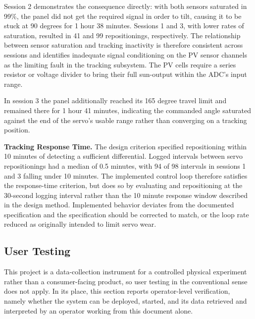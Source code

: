 \documentclass[journal]{IEEEtran}
\begin{document}
Session 2 demonstrates the consequence directly: with both sensors saturated in 99\%,
the panel did not get the required signal in order to tilt, causing it to be stuck at
90 degrees for 1 hour 38 minutes. Sessions 1 and 3, with lower rates of saturation,
resulted in 41 and 99 repositionings, respectively. The relationship between sensor
saturation and tracking inactivity is therefore consistent across sessions and
identifies inadequate signal conditioning on the PV sensor channels as the limiting
fault in the tracking subsystem. The PV cells require a series resistor or voltage
divider to bring their full sun-output within the ADC's input range.

In session 3 the panel additionally reached its 165 degree travel limit and remained
there for 1 hour 41 minutes, indicating the commanded angle saturated against the end of
the servo's usable range rather than converging on a tracking position.

\textbf{Tracking Response Time.} The design criterion specified repositioning within
10 minutes of detecting a sufficient differential. Logged intervals between servo
repositionings had a median of 0.5 minutes, with 94 of 98 intervals in sessions 1 and 3
falling under 10 minutes. The implemented control loop therefore satisfies the
response-time criterion, but does so by evaluating and repositioning at the 30-second
logging interval rather than the 10 minute response window described in the design
method. Implemented behavior deviates from the documented specification and the
specification should be corrected to match, or the loop rate reduced as originally
intended to limit servo wear.

\subsection{User Testing}

This project is a data-collection instrument for a controlled physical experiment
rather than a consumer-facing product, so user testing in the conventional sense does
not apply. In its place, this section reports operator-level verification, namely
whether the system can be deployed, started, and its data retrieved and interpreted by
an operator working from this document alone.
\end{document}
